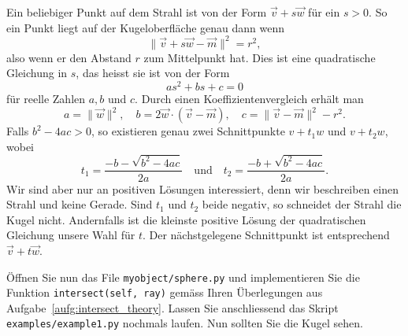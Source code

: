 \begin{losung*}
	Ein beliebiger Punkt auf dem Strahl ist von der Form $\vec{v}+s\vec{w}$ für ein $s>0$.
	So ein Punkt liegt auf der Kugeloberfläche genau dann wenn
	\begin{equation*}
		\lVert\vec{v}+s\vec{w}-\vec{m}\rVert^2=r^2,
	\end{equation*}
	also wenn er den Abstand $r$ zum Mittelpunkt hat.
	Dies ist eine quadratische Gleichung in $s$, das heisst sie ist von der Form
	\begin{equation*}
		as^2+bs+c=0
	\end{equation*}
	für reelle Zahlen $a,b$ und $c$.
	Durch einen Koeffizientenvergleich erhält man
	\begin{equation*}
		a=\rVert\vec{w}\rVert^2,\quad
		b=2\vec{w}\cdot(\vec{v}-\vec{m}),\quad
		c=\lVert\vec{v}-\vec{m}\rVert^2-r^2.
	\end{equation*}
	Falls $b^2-4ac>0$, so existieren genau zwei Schnittpunkte $v+t_1w$ und $v+t_2w$, wobei
	\begin{equation*}
		t_1=\frac{-b-\sqrt{b^2-4ac}}{2a}
		\quad\text{und}\quad
		t_2=\frac{-b+\sqrt{b^2-4ac}}{2a}.
	\end{equation*}
	Wir sind aber nur an positiven Lösungen interessiert, denn wir beschreiben einen Strahl und keine Gerade.
	Sind $t_1$ und $t_2$ beide negativ, so schneidet der Strahl die Kugel nicht.
	Andernfalls ist die kleinste positive Lösung der quadratischen Gleichung unsere Wahl für $t$.
	Der nächstgelegene Schnittpunkt ist entsprechend $\vec{v}+t\vec{w}$.
\end{losung*}
\begin{aufgabe}\label{aufg:intersect_implementation}
	Öffnen Sie nun das File \texttt{myobject/sphere.py} und implementieren Sie die Funktion \texttt{intersect(self, ray)} gemäss Ihren Überlegungen aus Aufgabe~\ref{aufg:intersect_theory}.
	Lassen Sie anschliessend das Skript \texttt{examples/example1.py} nochmals laufen.
	Nun sollten Sie die Kugel sehen.
\end{aufgabe}
